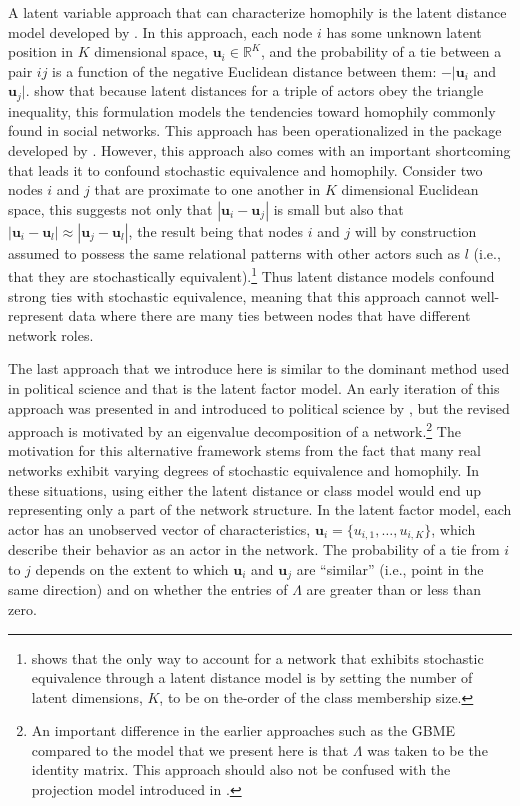 A latent variable approach that can characterize homophily is the latent distance model developed by \citet{hoff:etal:2002}. In this approach, each node $i$ has some unknown latent position in $K$ dimensional space, $\bm u_{i} \in \mathbb{R}^{K}$, and the probability of a tie between a pair $ij$ is a function of the negative Euclidean distance between them: $-|\bm u_{i}$ and $\bm u_{j}|$. \citet{hoff:etal:2002} show that because latent distances for a triple of actors obey the triangle inequality, this formulation models the tendencies toward homophily commonly found in social networks. This approach has been operationalized in the  package developed by \citet{krivitsky:handcock:2015}. However, this approach also comes with an important shortcoming that leads it to confound stochastic equivalence and homophily. Consider two nodes $i$ and $j$ that are proximate to one another in $K$ dimensional Euclidean space, this suggests not only that $|\bm u_{i} - \bm u_{j}|$ is small but also that $|\bm u_{i} - \bm u_{l}| \approx |\bm u_{j} - \bm u_{l}|$, the result being that nodes $i$ and $j$ will by construction assumed to possess the same relational patterns with other actors such as $l$ (i.e., that they are stochastically equivalent).\footnote{\citet{hoff:2008} shows that the only way to account for a network that exhibits stochastic equivalence through a latent distance model is by setting the number of latent dimensions, $K$, to be on the-order of the class membership size.} Thus latent distance models confound strong ties with stochastic equivalence, meaning that this approach cannot well-represent data where there are many ties between nodes that have different network roles. 

The last approach that we introduce here is similar to the dominant method used in political science and that is the latent factor model. An early iteration of this approach was presented in \citet{hoff:2005} and introduced to political science by \citet{hoff:ward:2004}, but the revised approach is motivated by an eigenvalue decomposition of a network.\footnote{An important difference in the earlier approaches such as the GBME compared to the model that we present here is that $\Lambda$ was taken to be the identity matrix. This approach should also not be confused with the projection model introduced in \citet{hoff:etal:2002}.} The motivation for this alternative framework stems from the fact that many real networks exhibit varying degrees of stochastic equivalence and homophily. In these situations, using either the latent distance or class model would end up representing only a part of the network structure. In the latent factor model, each actor has an unobserved vector of characteristics, $\bm u_{i} = \{u_{i,1}, \ldots, u_{i,K} \}$, which describe their behavior as an actor in the network. The probability of a tie from $i$ to $j$ depends on the extent to which $\bm u_{i}$ and $\bm u_{j}$ are ``similar'' (i.e., point in the same direction) and on whether the entries of $\Lambda$ are greater than or less than zero. 

